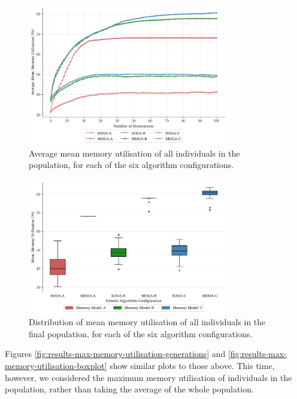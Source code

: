\documentclass[10pt,conference]{IEEEtran}
\begin{document}
\begin{figure}[!ht]
  \centering
  \includegraphics*[width=8.8cm,keepaspectratio]{fig/results-avg-memory-utilisation-generations}
\vspace{-5ex}
  \caption{Average mean memory utilisation of all individuals in the population, for each of the six algorithm configurations.}
  \label{fig:results-avg-memory-utilisation-generations}
\vspace{-2.5ex}
\end{figure}

\begin{figure}[!ht]
  \centering
  \includegraphics*[width=8.8cm,keepaspectratio]{fig/results-avg-memory-utilisation-boxplot}
\vspace{-4ex}
  \caption{Distribution of mean memory utilisation of all individuals in the final population, for each of the six algorithm configurations.}
  \label{fig:results-avg-memory-utilisation-boxplot}
\vspace{-3ex}
\end{figure}

Figures \ref{fig:results-max-memory-utilisation-generations} and \ref{fig:results-max-memory-utilisation-boxplot} show similar plots to those above. This time, however, we considered the maximum memory utilisation of individuals in the population, rather than taking the average of the whole population.
\end{document}
